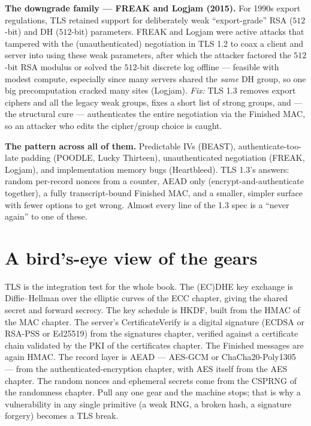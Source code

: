 \begin{attackbox}
\textbf{The downgrade family --- FREAK and Logjam (2015).} For 1990s export
regulations, TLS retained support for deliberately weak ``export-grade'' RSA
($512$-bit) and DH ($512$-bit) parameters. FREAK and Logjam were active attacks
that tampered with the (unauthenticated) negotiation in TLS 1.2 to coax a client
and server into using these weak parameters, after which the attacker factored the
$512$-bit RSA modulus or solved the $512$-bit discrete log offline --- feasible with
modest compute, especially since many servers shared the \emph{same} DH group, so
one big precomputation cracked many sites (Logjam). \emph{Fix:} TLS 1.3 removes
export ciphers and all the legacy weak groups, fixes a short list of strong groups,
and --- the structural cure --- authenticates the entire negotiation via the Finished
MAC, so an attacker who edits the cipher/group choice is caught.
\end{attackbox}

\begin{focusbox}
\textbf{The pattern across all of them.} Predictable IVs (BEAST), authenticate-too-late
padding (POODLE, Lucky Thirteen), unauthenticated negotiation (FREAK, Logjam), and
implementation memory bugs (Heartbleed). TLS 1.3's answers: random per-record
nonces from a counter, AEAD only (encrypt-and-authenticate together), a fully
transcript-bound Finished MAC, and a smaller, simpler surface with fewer options to
get wrong. Almost every line of the 1.3 spec is a ``never again'' to one of these.
\end{focusbox}

\section{A bird's-eye view of the gears}

\begin{connectionbox}
TLS is the integration test for the whole book. The (EC)DHE key exchange is
Diffie--Hellman over the elliptic curves of the ECC chapter, giving the shared
secret and forward secrecy. The key schedule is HKDF, built from the HMAC of the
MAC chapter. The server's CertificateVerify is a digital signature (ECDSA or
RSA-PSS or Ed25519) from the signatures chapter, verified against a certificate
chain validated by the PKI of the certificates chapter. The Finished messages are
again HMAC. The record layer is AEAD --- AES-GCM or ChaCha20-Poly1305 --- from the
authenticated-encryption chapter, with AES itself from the AES chapter. The random
nonces and ephemeral secrets come from the CSPRNG of the randomness chapter. Pull
any one gear and the machine stops; that is why a vulnerability in any single
primitive (a weak RNG, a broken hash, a signature forgery) becomes a TLS break.
\end{connectionbox}

